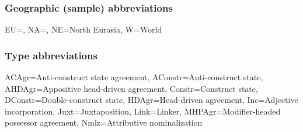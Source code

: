 \subsubsection{Geographic (sample) abbreviations}
\begin{flushleft}
EU=, NA=, NE=North Eurasia, W=World
\end{flushleft}

\subsubsection{Type abbreviations}
\begin{flushleft}
ACAgr=Anti-construct state agreement, AConstr=Anti-construct state, AHDAgr=Appositive head\hyp{}driven agreement, Constr=Construct state, DConstr=Double-construct state, HDAgr=Head\hyp{}driven agreement, Inc=Adjective incorporation, Juxt=Juxtaposition, Link=Linker, MHPAgr=Modifier-headed possessor agreement, Nmlz=Attributive nominalization
\end{flushleft}

